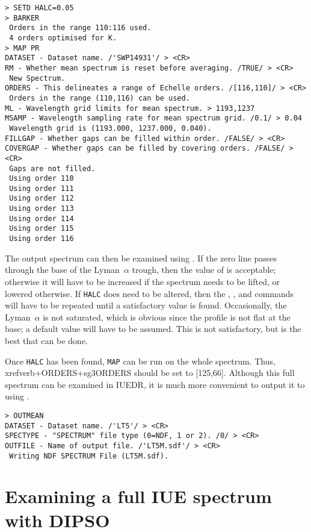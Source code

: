 \begin{verbatim}
> SETD HALC=0.05
> BARKER
 Orders in the range 110:116 used.
 4 orders optimised for K.
> MAP PR
DATASET - Dataset name. /'SWP14931'/ > <CR>
RM - Whether mean spectrum is reset before averaging. /TRUE/ > <CR>
 New Spectrum.
ORDERS - This delineates a range of Echelle orders. /[116,110]/ > <CR>
 Orders in the range (110,116) can be used.
ML - Wavelength grid limits for mean spectrum. > 1193,1237
MSAMP - Wavelength sampling rate for mean spectrum grid. /0.1/ > 0.04
 Wavelength grid is (1193.000, 1237.000, 0.040).
FILLGAP - Whether gaps can be filled within order. /FALSE/ > <CR>
COVERGAP - Whether gaps can be filled by covering orders. /FALSE/ > <CR>
 Gaps are not filled.
 Using order 110
 Using order 111
 Using order 112
 Using order 113
 Using order 114
 Using order 115
 Using order 116
\end{verbatim}

The output spectrum can then be examined using
\@.  If the zero
line passes through the base of the Lyman~$\alpha$ trough, then the value of
 is acceptable; otherwise it will have to be 
increased if the
spectrum needs to be lifted, or lowered otherwise.  If \verb+HALC+ does need
to be altered, then the , 
, and 
commands will have to be repeated until a satisfactory value is found.
Occasionally, the Lyman~$\alpha$ is not saturated, which is obvious since the
profile is not flat at the base; a default value will have to be assumed.  This
is not satisfactory, but is the best that can be done.

Once \verb+HALC+ has been found, \verb+MAP+ can be run on the whole spectrum.
Thus, \\xref{verb+ORDERS+}{sg3}{ORDERS} should be set to [125,66]\@.  
Although this full spectrum
can be examined in IUEDR, it is much more convenient to output it to 
using \@.

\begin{verbatim}
> OUTMEAN
DATASET - Dataset name. /'LT5'/ > <CR>
SPECTYPE - "SPECTRUM" file type (0=NDF, 1 or 2). /0/ > <CR>
OUTFILE - Name of output file. /'LT5M.sdf'/ > <CR>
 Writing NDF SPECTRUM File (LT5M.sdf).
\end{verbatim}

\section{Examining a full IUE spectrum with DIPSO}

